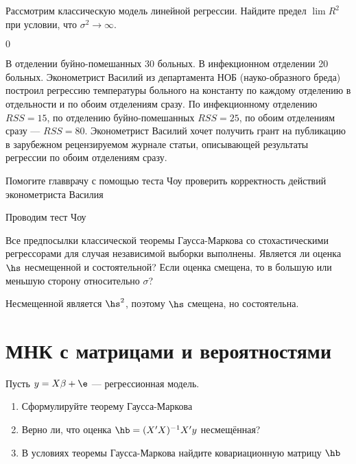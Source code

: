 \documentclass[pdftex,11pt,openany]{book}\usepackage[]{graphicx}\usepackage[]{color}
\begin{document}
\begin{solution}
\end{solution}


\begin{problem}
Рассмотрим классическую модель линейной регрессии. Найдите предел $\lim R^2$ при условии, что $\sigma^2 \rightarrow \infty$.
\end{problem}


\begin{solution}
$0$
\end{solution}


\begin{problem}
В отделении буйно-помешанных 30 больных. В инфекционном отделении 20 больных. Эконометрист Василий из департамента НОБ (науко-образного бреда) построил регрессию температуры больного на константу по каждому отделению в отдельности и по обоим отделениям сразу. По инфекционному отделению $RSS=15$, по отделению буйно-помешанных $RSS=25$, по обоим отделениям сразу --- $RSS=80$. Эконометрист Василий хочет получить грант на публикацию в зарубежном рецензируемом журнале статьи, описывающей результаты регрессии по обоим отделениям сразу. 

Помогите главврачу с помощью теста Чоу проверить корректность действий эконометриста Василия
\end{problem}

\begin{solution}
Проводим тест Чоу
\end{solution}


\begin{problem}
Все предпосылки классической теоремы Гаусса-Маркова со стохастическими регрессорами для случая независимой выборки выполнены. Является ли оценка $\hs$ несмещенной и состоятельной? Если оценка смещена, то в большую или меньшую сторону относительно $\sigma$?
\end{problem}

\begin{solution}
Несмещенной является $\hs^2$, поэтому $\hs$ смещена, но состоятельна. 
\end{solution}


\chapter{МНК с матрицами и вероятностями}


\begin{problem} 
Пусть $y = X\beta + \e$ --- регрессионная модель.
\begin{enumerate}
\item Сформулируйте теорему Гаусса-Маркова
\item Верно ли, что оценка $\hb = (X'X)^{-1}X'y$ несмещённая?
\item В условиях теоремы Гаусса-Маркова найдите ковариационную матрицу $\hb$
\end{enumerate}
\end{problem}
\end{document}

